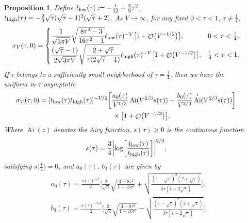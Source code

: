 \documentclass[10pt,a4paper]{amsart}
\DeclareMathOperator{\OO}{\mathcal{O}}
\DeclareMathOperator{\Ai}{Ai}
\numberwithin{equation}{section}
\newtheorem{Proposition}[Theorem]{Proposition}
 { \theoremstyle{definition}
\newtheorem{Definition}[Theorem]{Definition}
\newtheorem{Note}[Theorem]{Note}
\newtheorem{Example}[Theorem]{Example}
\newtheorem{Remark}[Theorem]{Remark} }
\begin{document}
\begin{Proposition} Define $t_{{\rm low}}(\tau) := -\frac{1}{12}+\frac{2}{9}\tau^2$,
$t_{{\rm high}}(\tau) = -\frac{2}{9} \sqrt{\tau}(\sqrt{\tau} - 1)^2(\sqrt{\tau} +2)$.
As $V\to \infty$, for any fixed $0 < \tau < 1$, $\tau \neq \frac{1}{4}$,
 \begin{equation}\label{sigma-asymptotics-nofield}
 \sigma_V(\tau,0) =
 \begin{cases}
 \dfrac{1}{\sqrt{3\pi V}}\sqrt{\dfrac{8\tau^2-3}{16\tau^2-1}} t_{{\rm low}}(\tau)^{-V}\bigl[1 + \OO\bigl(V^{-1/2}\bigr)\bigr], & 0 < \tau < \frac{1}{4},\\[1.5mm]
 \dfrac{(\sqrt{\tau}-1)}{2\sqrt{3\pi V}}\sqrt{\dfrac{2+\sqrt{\tau}}{\tau (2\sqrt{\tau}-1)}}t_{{\rm high}}(\tau)^{-V}\bigl[1 + \OO\bigl(V^{-1/2}\bigr)\bigr], & \frac{1}{4} < \tau < 1.
 \end{cases}
 \end{equation}
If $\tau$ belongs to a sufficiently small neighborhood of $\tau = \frac{1}{4}$, then we have the \textit{uniform in $\tau$} asymptotic
 \begin{gather*}
 \sigma_V(\tau,0) = [t_{{\rm low}}(\tau)t_{{\rm high}}(\tau)]^{-V/2}\biggl[\frac{a_0(\tau)}{V^{1/3}}\Ai(V^{2/3}s(\tau)) + \frac{b_0(\tau)}{V^{2/3}}\Ai'(V^{2/3}s(\tau))\biggr]\\
 \hphantom{\sigma_V(\tau,0) =}{}
 \times \bigl[1 + \OO\bigl(V^{-1/3}\bigr)\bigr],
 \end{gather*}
Where $\Ai(z)$ denotes the Airy function, $s(\tau) \geq 0$ is the continuous function
 \begin{equation}\label{s-definition}
 s(\tau) = \frac{3}{4}\biggl|\log\biggl[\frac{t_{{\rm low}}(\tau)}{t_{{\rm high}}(\tau)}\biggr]\biggr|^{2/3},
 \end{equation}
satisfying $s\bigl(\frac{1}{4}\bigr) = 0$, and $a_0(\tau)$, $b_0(\tau)$ are given by
 \begin{align*}
 &a_0(\tau)=\frac{s(\tau)^{1/4}}{2}\Biggl[\frac{2}{\sqrt{3}}\sqrt{\frac{3-8\tau^2}{1-16\tau^2}} + \sqrt{\frac{(1-\sqrt{\tau})^2(2+\sqrt{\tau})}{3\tau(1-2\sqrt{\tau})}}\Biggr],\\
 &b_0(\tau)=\frac{s(\tau)^{-1/4}}{2}\Biggl[\frac{2}{\sqrt{3}}\sqrt{\frac{3-8\tau^2}{1-16\tau^2}} - \sqrt{\frac{(1-\sqrt{\tau})^2(2+\sqrt{\tau})}{3\tau(1-2\sqrt{\tau})}}\Biggr].
 \end{align*}
\end{Proposition}
\end{document}
